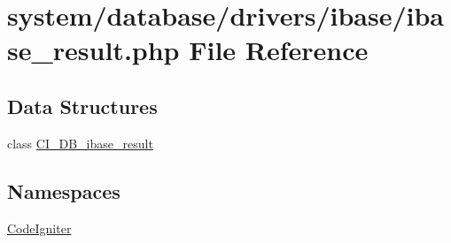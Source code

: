 \hypertarget{ibase__result_8php}{}\section{system/database/drivers/ibase/ibase\+\_\+result.php File Reference}
\label{ibase__result_8php}
\subsection*{Data Structures}
\begin{DoxyCompactItemize}
\item 
class \mbox{\hyperlink{class_c_i___d_b__ibase__result}{C\+I\+\_\+\+D\+B\+\_\+ibase\+\_\+result}}
\end{DoxyCompactItemize}
\subsection*{Namespaces}
\begin{DoxyCompactItemize}
\item 
 \mbox{\hyperlink{namespace_code_igniter}{Code\+Igniter}}
\end{DoxyCompactItemize}
